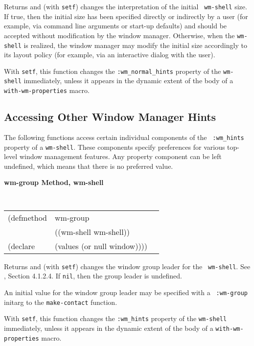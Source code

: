 \begin{flushright} \parbox[t]{6.125in}{
Returns and (with {\tt setf}) changes the interpretation of the initial {\tt
wm-shell} size. If true, then the initial size has been specified
directly or indirectly by a user (for example, via command line arguments or
start-up defaults) and should be accepted without modification by the window
manager. Otherwise, when the {\tt wm-shell} is realized, the window manager may
modify the initial size accordingly to its layout policy (for example, via
an interactive dialog with the user).

With {\tt setf}, this function changes the {\tt :wm\_normal\_hints} property of
the {\tt wm-shell} immediately, unless it appears in the dynamic extent of the
body of a {\tt with-wm-properties} macro.

}\end{flushright}

{\samepage
\subsection*{Accessing Other Window Manager Hints} 

The following functions access certain individual components of the {\tt
:wm\_hints} property of a {\tt wm-shell}. These components specify preferences
for various top-level window management features. Any property component
can be left undefined, which means that there is no preferred value.
}

{\samepage
{\large {\bf wm-group \hfill Method, wm-shell}}
\begin{flushright} \parbox[t]{6.125in}{
\tt
\begin{tabular}{lll}
\raggedright
(defmethod & wm-group & \\
           & ((wm-shell  wm-shell)) \\
(declare   & (values (or null window))))
\end{tabular}
\rm

}\end{flushright}}

\begin{flushright} \parbox[t]{6.125in}{
Returns and (with {\tt setf}) changes the window group leader for the {\tt
wm-shell}. See \cite{icccm}, Section 4.1.2.4. If {\tt nil}, then the group leader is
undefined. 

An initial value for the window group leader may be specified with a {\tt
:wm-group} initarg to the {\tt make-contact} function.

With {\tt setf}, this function changes the {\tt :wm\_hints} property of
the {\tt wm-shell} immediately, unless it appears in the dynamic extent of the
body of a {\tt with-wm-properties} macro.


}\end{flushright}


